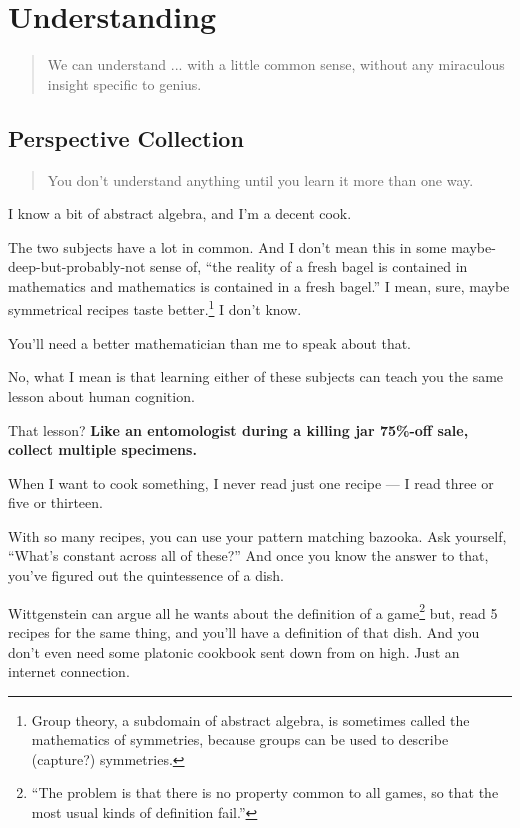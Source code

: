 \chapter{Understanding}

\begin{quote}
 We can understand ... with a little common sense, without any miraculous insight specific to genius.
\end{quote}

\section{Perspective Collection}

\begin{quote}
You don't understand anything until you learn it more than one way.
\end{quote}

I know a bit of abstract algebra, and I'm a decent cook. 

The two subjects have a lot in common. And I don't mean this in some
maybe-deep-but-probably-not sense of, ``the reality of a fresh bagel is contained in mathematics and mathematics
is contained in a fresh bagel.'' I mean, sure, maybe symmetrical
recipes taste better.\footnote{Group theory, a subdomain of abstract algebra, is
  sometimes called the mathematics of symmetries, because groups can be used to
  describe (capture?) symmetries.} I don't know.

You'll need a better mathematician than me to speak about that.

No, what I mean is that learning either of these subjects can teach you the same
lesson about human cognition.

That lesson? \textbf{Like an entomologist during a killing jar 75\%-off sale, collect
  multiple specimens.}

When I want to cook something, I never read just one recipe --- I read three
or five or thirteen.

With so many recipes, you can use your pattern matching bazooka. Ask yourself, ``What's
constant across all of these?'' And once you know the answer to that,
you've figured out the quintessence of a dish.

Wittgenstein can argue all he wants about the definition of a
game\footnote{``The problem is that there is no property common to all games, so that the most usual kinds of definition fail.''} but, read 5
recipes for the same thing, and you'll have a definition of that dish. And you
don't even need some platonic cookbook sent down from on high. Just an internet
connection.

